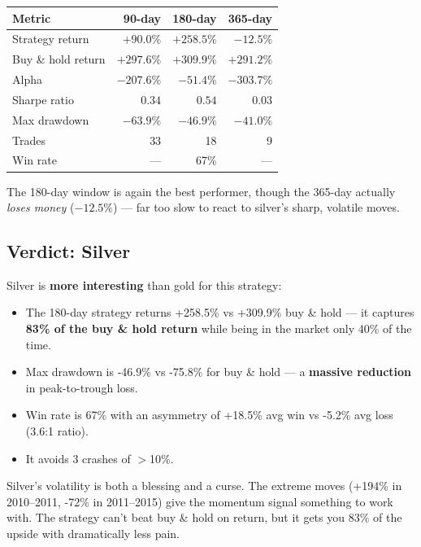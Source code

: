 \documentclass[11pt,a4paper]{article}
\begin{document}
\vspace{0.5em}
\begin{tabular}{@{}lrrr@{}}
    \toprule
    \textbf{Metric} & \textbf{90-day} & \textbf{180-day} & \textbf{365-day} \\
    \midrule
    Strategy return    & $+90.0\%$  & $+258.5\%$ & $-12.5\%$  \\
    Buy \& hold return & $+297.6\%$ & $+309.9\%$ & $+291.2\%$ \\
    Alpha              & $-207.6\%$ & $-51.4\%$  & $-303.7\%$ \\
    Sharpe ratio       & $0.34$     & $0.54$     & $0.03$     \\
    Max drawdown       & $-63.9\%$  & $-46.9\%$  & $-41.0\%$  \\
    Trades             & 33         & 18         & 9          \\
    Win rate           & ---        & 67\%       & ---        \\
    \bottomrule
\end{tabular}

\vspace{0.5em}
The 180-day window is again the best performer, though the 365-day
actually \emph{loses money} ($-12.5\%$) --- far too slow to react to
silver's sharp, volatile moves.

\subsection{Verdict: Silver}

Silver is \textbf{more interesting} than gold for this strategy:

\begin{itemize}[leftmargin=2em]
    \item The 180-day strategy returns +258.5\% vs +309.9\% buy \&
          hold --- it captures \textbf{83\% of the buy \& hold return}
          while being in the market only 40\% of the time.
    \item Max drawdown is -46.9\% vs -75.8\% for buy \& hold ---
          a \textbf{massive reduction} in peak-to-trough loss.
    \item Win rate is 67\% with an asymmetry of +18.5\% avg win vs
          -5.2\% avg loss (3.6:1 ratio).
    \item It avoids 3 crashes of $>$10\%.
\end{itemize}

Silver's volatility is both a blessing and a curse. The extreme moves
(+194\% in 2010--2011, -72\% in 2011--2015) give the momentum signal
something to work with. The strategy can't beat buy \& hold on return,
but it gets you 83\% of the upside with dramatically less pain.
\end{document}
